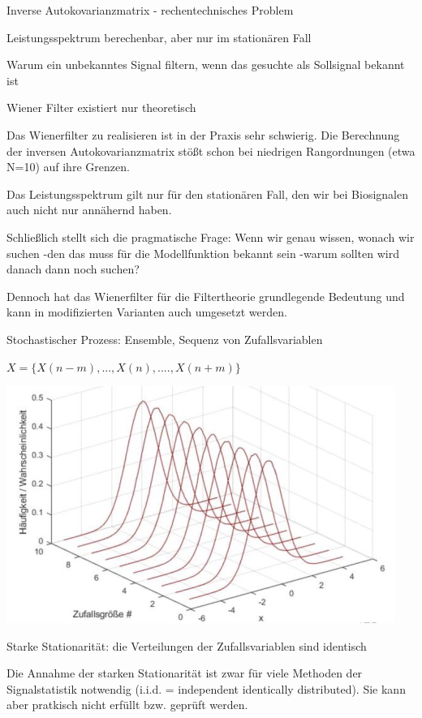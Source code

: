 \documentclass[a4paper]{article}
\begin{document}
\begin{multicols}{3}
  \begin{itemize*}
    \item Inverse Autokovarianzmatrix - rechentechnisches Problem
    \item Leistungsspektrum berechenbar, aber nur im stationären Fall
    \item Warum ein unbekanntes Signal filtern, wenn das gesuchte als Sollsignal bekannt ist
    \begin{itemize*}
      \item Wiener Filter existiert nur theoretisch
      \item Das Wienerfilter zu realisieren ist in der Praxis sehr schwierig. Die Berechnung der inversen Autokovarianzmatrix stößt schon bei niedrigen Rangordnungen (etwa N=10) auf ihre Grenzen.
      \item Das Leistungsspektrum gilt nur für den stationären Fall, den wir bei Biosignalen auch nicht nur annähernd haben.
      \item Schließlich stellt sich die pragmatische Frage: Wenn wir genau wissen, wonach wir suchen -den das muss für die Modellfunktion bekannt sein -warum sollten wird danach dann noch suchen?
      \item Dennoch hat das Wienerfilter für die Filtertheorie grundlegende Bedeutung und kann in modifizierten Varianten auch umgesetzt werden.
    \end{itemize*}
  \end{itemize*}

  Stochastischer Prozess: Ensemble, Sequenz von Zufallsvariablen

  \begin{itemize*}
    \item $X=\{X(n-m),...,X(n),....,X(n+m)\}$
    \item \includegraphics[width=.5\linewidth]{Assets/Biosignalverarbeitung-adaptiver-filter-stochastik.png}
    \item Starke Stationarität: die Verteilungen der Zufallsvariablen sind identisch
    \item Die Annahme der starken Stationarität ist zwar für viele Methoden der Signalstatistik notwendig (i.i.d. = independent identically distributed). Sie kann aber pratkisch nicht erfüllt bzw. geprüft werden.
  \end{itemize*}


\end{multicols}
\end{document}

